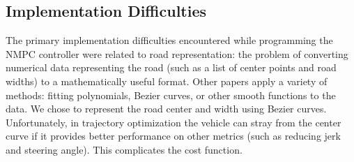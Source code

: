 \documentclass[conference]{IEEEtran}
\begin{document}
	
	
	
	
	
\label{sub:impl}
\subsection{Implementation Difficulties}

The primary implementation difficulties encountered while programming the NMPC controller were related to road representation: the problem of converting numerical data representing the road (such as a list of center points and road widths) to a mathematically useful format. Other papers apply a variety of methods: fitting polynomials, Bezier curves, or other smooth functions to the data. We chose to represent the road center and width using Bezier curves.
Unfortunately, in trajectory optimization the vehicle can stray from the center curve if it provides better performance on other metrics (such as reducing jerk and steering angle). This complicates the  cost function.





\end{document}
